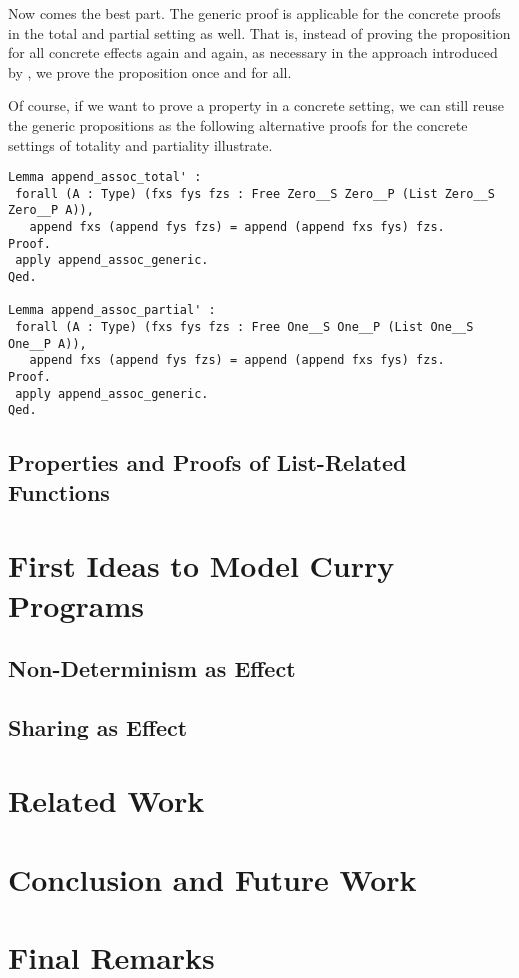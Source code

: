 Now comes the best part.
The generic proof is applicable for the concrete proofs in the total
and partial setting as well.
That is, instead of proving the proposition for all concrete effects
again and again, as necessary in the approach introduced by
\cite{abel2005verifying}, we prove the proposition once and for all.

Of course, if we want to prove a property in a concrete setting, we
can still reuse the generic propositions as the following alternative
proofs for the concrete settings of totality and partiality
illustrate.

\begin{verbatim}
Lemma append_assoc_total' :
 forall (A : Type) (fxs fys fzs : Free Zero__S Zero__P (List Zero__S Zero__P A)),
   append fxs (append fys fzs) = append (append fxs fys) fzs.
Proof.
 apply append_assoc_generic.
Qed.

Lemma append_assoc_partial' :
 forall (A : Type) (fxs fys fzs : Free One__S One__P (List One__S One__P A)),
   append fxs (append fys fzs) = append (append fxs fys) fzs.
Proof.
 apply append_assoc_generic.
Qed.
\end{verbatim}

\subsection{Properties and Proofs of List-Related Functions}

\section{First Ideas to Model Curry Programs}
\subsection{Non-Determinism as Effect}
\subsection{Sharing as Effect}

\section{Related Work}
\section{Conclusion and Future Work}

\section{Final Remarks}
